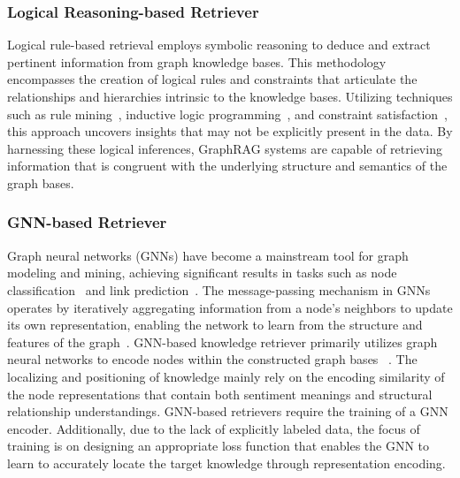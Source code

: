 \documentclass[lettersize,journal]{IEEEtran}
\begin{document}
\subsubsection{Logical Reasoning-based Retriever}
Logical rule-based retrieval employs symbolic reasoning to deduce and extract pertinent information from graph knowledge bases. This methodology encompasses the creation of logical rules and constraints that articulate the relationships and hierarchies intrinsic to the knowledge bases. Utilizing techniques such as rule mining~\cite{chen2024rulerag}, inductive logic programming~\cite{lee2024diakop}, and constraint satisfaction~\cite{luo2024reasoning}, this approach uncovers insights that may not be explicitly present in the data. By harnessing these logical inferences, GraphRAG systems are capable of retrieving information that is congruent with the underlying structure and semantics of the graph bases.


\subsubsection{GNN-based Retriever}
Graph neural networks (GNNs) have become a mainstream tool for graph modeling and mining, achieving significant results in tasks such as node classification~\cite{NIPS2017_graphsage,bei2023reinforcement,li2024gslb, liu2023rsc} and link prediction~\cite{zhang2018link, chen2024gcr,bei2023nonrec}.
The message-passing mechanism in GNNs operates by iteratively aggregating information from a node's neighbors to update its own representation, enabling the network to learn from the structure and features of the graph~\cite{NIPS2017_graphsage}. 
GNN-based knowledge retriever primarily utilizes graph neural networks to encode nodes within the constructed graph bases~\cite{li2024graph,park2024generative,kang2023knowledge,kang2023knowledge} . The localizing and positioning of knowledge mainly rely on the encoding similarity of the node representations that contain both sentiment meanings and structural relationship understandings. GNN-based retrievers require the training of a GNN encoder. Additionally, due to the lack of explicitly labeled data, the focus of training is on designing an appropriate loss function that enables the GNN to learn to accurately locate the target knowledge through representation encoding.
\end{document}
